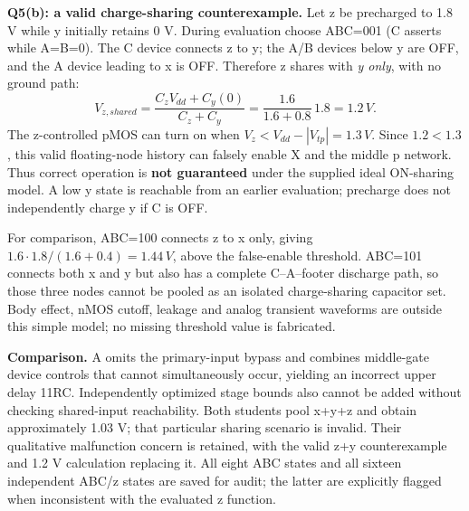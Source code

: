 \documentclass[10pt]{article}
\begin{document}
\newpage\textbf{Q5(b): a valid charge-sharing counterexample.} Let z be precharged to 1.8 V while y initially retains 0 V. During evaluation choose ABC=001 (C asserts while A=B=0). The C device connects z to y; the A/B devices below y are OFF, and the A device leading to x is OFF. Therefore z shares with \emph{y only}, with no ground path:
\[V_{z,shared}=\frac{C_zV_{dd}+C_y(0)}{C_z+C_y}=\frac{1.6}{1.6+0.8}\,1.8=1.2\,V.\]
The z-controlled pMOS can turn on when $V_z<V_{dd}-|V_{tp}|=1.3\,V$. Since $1.2<1.3$, this valid floating-node history can falsely enable X and the middle p network. Thus correct operation is \textbf{not guaranteed} under the supplied ideal ON-sharing model. A low y state is reachable from an earlier evaluation; precharge does not independently charge y if C is OFF.

For comparison, ABC=100 connects z to x only, giving $1.6\cdot1.8/(1.6+0.4)=1.44\,V$, above the false-enable threshold. ABC=101 connects both x and y but also has a complete C--A--footer discharge path, so those three nodes cannot be pooled as an isolated charge-sharing capacitor set. Body effect, nMOS cutoff, leakage and analog transient waveforms are outside this simple model; no missing threshold value is fabricated.

\textbf{Comparison.} A omits the primary-input bypass and combines middle-gate device controls that cannot simultaneously occur, yielding an incorrect upper delay 11RC. Independently optimized stage bounds also cannot be added without checking shared-input reachability. Both students pool x+y+z and obtain approximately 1.03 V; that particular sharing scenario is invalid. Their qualitative malfunction concern is retained, with the valid z+y counterexample and 1.2 V calculation replacing it. All eight ABC states and all sixteen independent ABC/z states are saved for audit; the latter are explicitly flagged when inconsistent with the evaluated z function.
\end{document}
